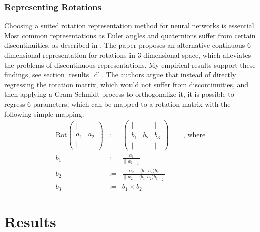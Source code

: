 \documentclass{article}
\begin{document}
\subsubsection{Representing Rotations}
\label{rotation_representation}
Choosing a suited rotation representation method for neural networks is essential. Most common representations as Euler angles and quaternions suffer from certain discontinuities, as described in \cite{rotation_representation}. The paper proposes an alternative continuous 6-dimensional representation for rotations in 3-dimensional space, which alleviates the problems of discontinuous representations.  My empirical results support these findings, see section \ref{results_dl}. The authors argue that instead of directly regressing the rotation matrix, which would not suffer from discontinuities, and then applying a Gram-Schmidt process to orthogonalize it, it is possible to regress 6 parameters, which can be mapped to a rotation matrix with the following simple mapping:
{
\begin{eqnarray*}
	\text{Rot}\begin{pmatrix}
		| & | \\
		a_1 & a_2 \\
		| & | 
	\end{pmatrix} &:=& \begin{pmatrix}
		| & | & |\\
		b_1 & b_2 & b_3\\
		| & | & |
	\end{pmatrix}
	\qquad \text{, where} \\
b_1 &:=& \frac{a_1}{\| a_1\|_2} \\
b_2 &:=& \frac{a_2 - \langle b_1, a_2\rangle b_1}{\| a_2 - \langle b_1, a_2\rangle b_1\|_2} \\
b_3 &:=& b_1 \times b_2
\end{eqnarray*}
}


\section{Results}
\label{results}
\end{document}
